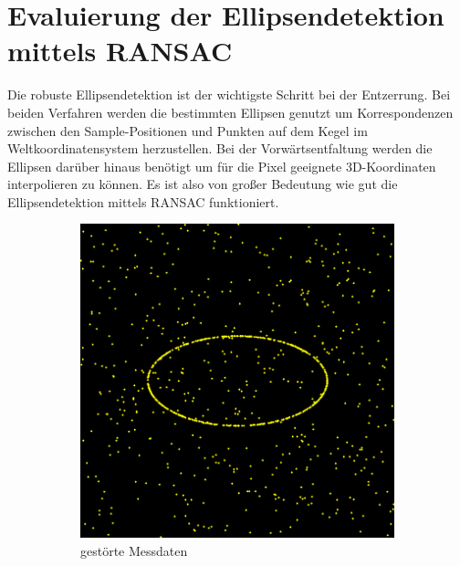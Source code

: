 {\section{Evaluierung der Ellipsendetektion mittels RANSAC}
Die robuste Ellipsendetektion ist der wichtigste Schritt bei der Entzerrung. Bei beiden Verfahren werden die bestimmten Ellipsen genutzt um Korrespondenzen zwischen den Sample-Positionen und Punkten auf dem Kegel im Weltkoordinatensystem herzustellen. Bei der Vorwärtsentfaltung werden die Ellipsen darüber hinaus benötigt um für die Pixel geeignete 3D-Koordinaten interpolieren zu können. Es ist also von großer Bedeutung wie gut die Ellipsendetektion mittels RANSAC funktioniert.


\begin{figure}[!htb]
	\centering
	\begin{subfigure}{.5\textwidth}
		\centering
		\includegraphics[width=.9\textwidth]{images/ransac50_0.png}
		\caption{gestörte Messdaten}
		\label{fig:uniformRansac1}
	\end{subfigure}%
	\begin{subfigure}{.5\textwidth}
		\centering

\end{subfigure}
\end{figure}}
